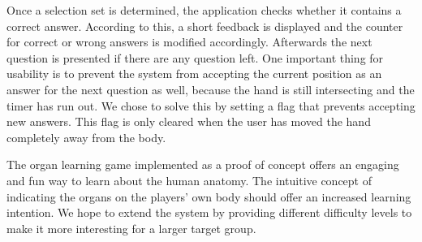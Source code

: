 Once a selection set is determined, the application checks whether it contains a correct answer. According to this, a short feedback is displayed and the counter for correct or wrong answers is modified accordingly. Afterwards the next question is presented if there are any question left. One important thing for usability is to prevent the system from accepting the current position as an answer for the next question as well, because the hand is still intersecting and the timer has run out. We chose to solve this by setting a flag that prevents accepting new answers. This flag is only cleared when the user has moved the hand completely away from the body.

The organ learning game implemented as a proof of concept offers an engaging and fun way to learn about the human anatomy. The intuitive concept of indicating the organs on the players' own body should offer an increased learning intention. 
We hope to extend the system by providing different difficulty levels to make it more interesting for a larger target group.
 
